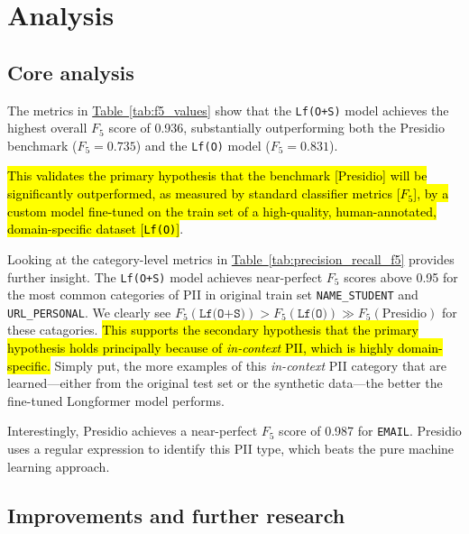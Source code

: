 \documentclass[11pt]{article}
\newcommand{\Tablink}[1]{\hyperref[#1]{Table~\ref*{#1}}}
\begin{document}
\section{Analysis} 

\subsection{Core analysis}

The metrics in \Tablink{tab:f5_values} show that the \texttt{Lf(O+S)} model achieves the highest overall $F_5$ score of 0.936, substantially outperforming both the Presidio benchmark ($F_5 = 0.735$) and the \texttt{Lf(O)} model ($F_5 = 0.831$).

\hl{This validates the primary hypothesis that the benchmark [Presidio] will be significantly outperformed, as measured by standard classifier metrics [$F_5$], by a custom model fine-tuned on the train set of a high-quality, human-annotated, domain-specific dataset [\texttt{Lf(O)}]}.

Looking at the category-level metrics in \Tablink{tab:precision_recall_f5} provides further insight. The \texttt{Lf(O+S)} model achieves near-perfect $F_5$ scores above 0.95 for the most common categories of PII in original train set \texttt{NAME\_STUDENT} and \texttt{URL\_PERSONAL}. We clearly see \( F_5(\texttt{Lf(O+S)}) > F_5(\texttt{Lf(O)}) \gg F_5(\text{Presidio}) \) for these catagories. \hl{This supports the secondary hypothesis that the primary hypothesis holds principally because of \textit{in-context} PII, which is highly domain-specific.} Simply put, the more examples of this \textit{in-context} PII category that are learned—either from the original test set or the synthetic data—the better the fine-tuned Longformer model performs.

Interestingly, Presidio achieves a near-perfect $F_5$ score of 0.987 for \texttt{EMAIL}. Presidio uses a regular expression to identify this PII type, which beats the pure machine learning approach.

\subsection{Improvements and further research}
\end{document}
